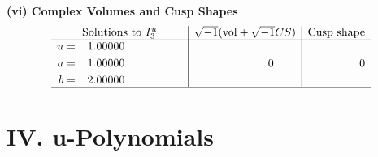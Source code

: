 \documentclass[1p]{elsarticle_modified}
\theoremstyle{definition}
\newcommand{\I}{\sqrt{-1}}
\begin{document}
\newpage\flushleft \textbf{(vi) Complex Volumes and Cusp Shapes}
$$\begin{array}{c|c|c}  
\text{Solutions to }I^u_{3}& \I (\text{vol} + \sqrt{-1}CS) & \text{Cusp shape}\\
 \hline 
\begin{aligned}
u &= \phantom{-}1.00000\phantom{ +0.000000I} \\
a &= \phantom{-}1.00000\phantom{ +0.000000I} \\
b &= \phantom{-}2.00000\phantom{ +0.000000I}\end{aligned}
 & \phantom{-0.000000 } 0 & \phantom{-0.000000 } 0\\
 \hline 
 \end{array}$$\newpage
\newpage\renewcommand{\arraystretch}{1}
\centering \section*{ IV. u-Polynomials}
\end{document}
